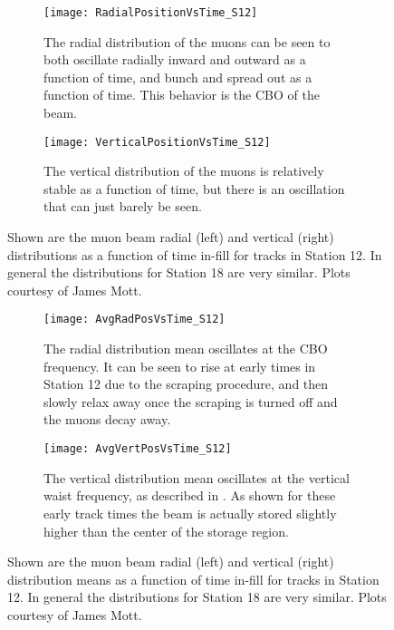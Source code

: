 \begin{figure}[]
\centering
    \begin{subfigure}[t]{0.47\textwidth}
        \centering
        \texttt{[image: RadialPositionVsTime\_S12]}
        \caption{The radial distribution of the muons can be seen to both oscillate radially inward and outward as a function of time, and bunch and spread out as a function of time. This behavior is the CBO of the beam.}
    \end{subfigure}
    \hspace{5mm}
    \begin{subfigure}[t]{0.47\textwidth}
        \centering
        \texttt{[image: VerticalPositionVsTime\_S12]}
        \caption{The vertical distribution of the muons is relatively stable as a function of time, but there is an oscillation that can just barely be seen.}
    \end{subfigure}
\caption[Muon beam radial and vertical distributions as a function of time in-fill]{Shown are the muon beam radial (left) and vertical (right) distributions as a function of time in-fill for tracks in Station 12. In general the distributions for Station 18 are very similar. Plots courtesy of James Mott.}
\label{fig:RadialVerticalVsTime}
\end{figure}


\begin{figure}[]
\centering
    \begin{subfigure}[t]{0.47\textwidth}
        \centering
        \texttt{[image: AvgRadPosVsTime\_S12]}
        \caption{The radial distribution mean oscillates at the CBO frequency. It can be seen to rise at early times in Station 12 due to the scraping procedure, and then slowly relax away once the scraping is turned off and the muons decay away.}
    \end{subfigure}
    \hspace{5mm}
    \begin{subfigure}[t]{0.47\textwidth}
        \centering
        \texttt{[image: AvgVertPosVsTime\_S12]}
        \caption{The vertical distribution mean oscillates at the vertical waist frequency, as described in . As shown for these early track times the beam is actually stored slightly higher than the center of the storage region.}
    \end{subfigure}
\caption[Muon beam radial and vertical distribution means as a function of time in-fill]{Shown are the muon beam radial (left) and vertical (right) distribution means as a function of time in-fill for tracks in Station 12. In general the distributions for Station 18 are very similar. Plots courtesy of James Mott.}
\label{fig:RadialVerticalMeans}
\end{figure}


